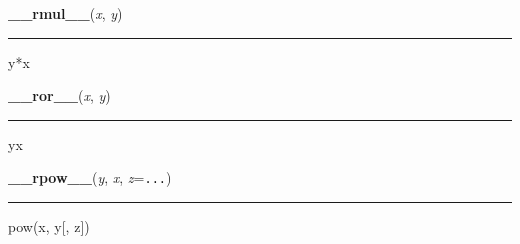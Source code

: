     \vspace{0.5ex}

    \begin{boxedminipage}{\textwidth}

    \raggedright \textbf{\_\_rmul\_\_}(\textit{x}, \textit{y})

    \vspace{-1.5ex}

    \rule{\textwidth}{0.5\fboxrule}

y*x
    \vspace{1ex}

    \end{boxedminipage}

    \label{numpy:ndarray:__ror__}

    \vspace{0.5ex}

    \begin{boxedminipage}{\textwidth}

    \raggedright \textbf{\_\_ror\_\_}(\textit{x}, \textit{y})

    \vspace{-1.5ex}

    \rule{\textwidth}{0.5\fboxrule}

y{\textbar}x
    \vspace{1ex}

    \end{boxedminipage}

    \label{numpy:ndarray:__rpow__}

    \vspace{0.5ex}

    \begin{boxedminipage}{\textwidth}

    \raggedright \textbf{\_\_rpow\_\_}(\textit{y}, \textit{x}, \textit{z}=\texttt{...})

    \vspace{-1.5ex}

    \rule{\textwidth}{0.5\fboxrule}

pow(x, y{[}, z{]})
    \vspace{1ex}

    \end{boxedminipage}

    \label{numpy:ndarray:__rrshift__}

    \vspace{0.5ex}

